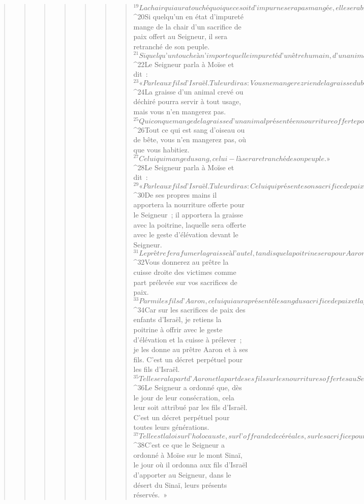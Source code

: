 \begin{verse}
\begin{verse}
\begin{verse}
\begin{verse}
\begin{verse}
\begin{verse}
\begin{verse}
${}^{19}La chair qui aura touché quoi que ce soit d’impur ne sera pas mangée, elle sera brûlée au feu. Mais toute chair pure, quiconque est pur pourra en manger. 
${}^{20}Si quelqu’un en état d’impureté mange de la chair d’un sacrifice de paix offert au Seigneur, il sera retranché de son peuple. 
${}^{21}Si quelqu’un touche à n’importe quelle impureté d’un être humain, d’un animal, ou à une chose immonde, quelle qu’elle soit, et mange ensuite de la chair d’un sacrifice de paix offert au Seigneur, cet individu sera retranché de son peuple. »
${}^{22}Le Seigneur parla à Moïse et dit : 
${}^{23}« Parle aux fils d’Israël. Tu leur diras : Vous ne mangerez rien de la graisse du bœuf, du jeune bélier ou de la chèvre. 
${}^{24}La graisse d’un animal crevé ou déchiré pourra servir à tout usage, mais vous n’en mangerez pas. 
${}^{25}Quiconque mange de la graisse d’un animal présenté en nourriture offerte pour le Seigneur, celui-là sera retranché de son peuple. 
${}^{26}Tout ce qui est sang d’oiseau ou de bête, vous n’en mangerez pas, où que vous habitiez. 
${}^{27}Celui qui mange du sang, celui-là sera retranché de son peuple. »
${}^{28}Le Seigneur parla à Moïse et dit : 
${}^{29}« Parle aux fils d’Israël. Tu leur diras : Celui qui présente son sacrifice de paix au Seigneur devra lui apporter son offrande réservée pour le sacrifice de paix. 
${}^{30}De ses propres mains il apportera la nourriture offerte pour le Seigneur ; il apportera la graisse avec la poitrine, laquelle sera offerte avec le geste d’élévation devant le Seigneur. 
${}^{31}Le prêtre fera fumer la graisse à l’autel, tandis que la poitrine sera pour Aaron et ses fils. 
${}^{32}Vous donnerez au prêtre la cuisse droite des victimes comme part prélevée sur vos sacrifices de paix. 
${}^{33}Parmi les fils d’Aaron, celui qui aura présenté le sang du sacrifice de paix et la graisse recevra comme part la cuisse droite. 
${}^{34}Car sur les sacrifices de paix des enfants d’Israël, je retiens la poitrine à offrir avec le geste d’élévation et la cuisse à prélever ; je les donne au prêtre Aaron et à ses fils. C’est un décret perpétuel pour les fils d’Israël.
${}^{35}Telle sera la part d’Aaron et la part de ses fils sur les nourritures offertes au Seigneur, dès le jour où on les fera s’approcher pour servir comme prêtres le Seigneur. 
${}^{36}Le Seigneur a ordonné que, dès le jour de leur consécration, cela leur soit attribué par les fils d’Israël. C’est un décret perpétuel pour toutes leurs générations.
${}^{37}Telle est la loi sur l’holocauste, sur l’offrande de céréales, sur le sacrifice pour la faute, sur le sacrifice de réparation, sur le sacrifice d’investiture et sur le sacrifice de paix. 
${}^{38}C’est ce que le Seigneur a ordonné à Moïse sur le mont Sinaï, le jour où il ordonna aux fils d’Israël d’apporter au Seigneur, dans le désert du Sinaï, leurs présents réservés. »
      

\end{verse}
\end{verse}
\end{verse}
\end{verse}
\end{verse}
\end{verse}
\end{verse}

